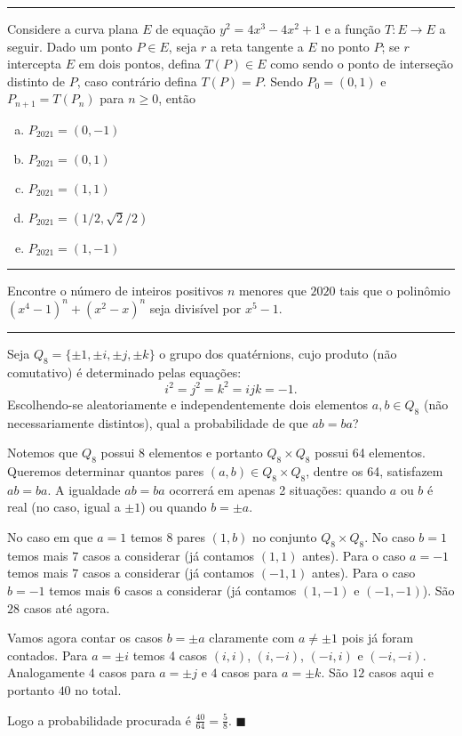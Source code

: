 \documentclass[a4paper,11pt]{report}
\renewcommand{\baselinestretch}{1.3}   %
\newcounter{execount}  \setcounter{execount}{1}
\newcommand{\newexe}{ \vspace{\baselineskip} \hrule  \vspace{.5\baselineskip} \noindent {\bfseries
\arabic{execount}.} \addtocounter{execount}{1} }
\newenvironment{solucao}{ \vspace{.5\baselineskip} \renewcommand{\baselinestretch}{1}
                           \noindent {\bfseries Solução:} }
                        { \vspace{.5\baselineskip} \renewcommand{\baselinestretch}{1.2}
                           \hfill {\small $\blacksquare$} }
\begin{document}
\newexe Considere a curva plana $E$ de equação $y^{2} = 4x^{3} - 4x^{2} + 1$ e a função $T : E \to
    E$ a seguir. Dado um ponto $P \in E$, seja $r$ a reta tangente a $E$ no ponto $P$; se $r$
intercepta $E$ em dois pontos, defina $T(P) \in E$ como sendo o ponto de interseção distinto
de $P$, caso contrário defina $T(P) = P$. Sendo $P_{0} = (0, 1)$ e $P_{n+1} = T(P_{n})$ para
$n \geq 0$, então
\begin{enumerate}[(a)]
    \item $P_{2021} = (0,-1)$
    \item $P_{2021} = (0, 1)$
    \item $P_{2021} = (1, 1)$
    \item $P_{2021} = (1/2, \sqrt{2}/2)$
    \item $P_{2021} = (1,-1)$
\end{enumerate}


\newexe Encontre o número de inteiros positivos $n$ menores que $2020$ tais que o polinômio
$(x^{4} - 1)^{n} + (x^{2} - x)^{n}$ seja divisível por $x^{5} - 1$.



\newexe Seja $Q_{8} = \{ \pm 1, \pm i, \pm j, \pm k \}$ o grupo dos quatérnions, cujo produto (não
comutativo) é determinado pelas equações:
$$ i^{2} = j^{2} = k^{2} = ijk = -1. $$
Escolhendo-se aleatoriamente e independentemente dois elementos $a, b \in Q_{8}$ (não
necessariamente distintos), qual a probabilidade de que $ab = ba$?

\begin{solucao}
    Notemos que $Q_{8}$ possui 8 elementos e portanto $Q_{8} \times Q_{8}$ possui 64 elementos.
    Queremos determinar quantos pares $(a,b) \in Q_{8} \times Q_{8}$, dentre os 64, satisfazem $ab
        = ba$. A igualdade $ab = ba$ ocorrerá em apenas 2 situações: quando $a$ ou $b$ é real (no
    caso, igual a $\pm 1$) ou quando $b = \pm a$.

    No caso em que $a = 1$ temos $8$ pares $(1,b)$ no conjunto $Q_{8} \times Q_{8}$. No caso $b =
        1$ temos mais $7$ casos a considerar (já contamos $(1,1)$ antes). Para o caso $a = -1$ temos
    mais $7$ casos a considerar (já contamos $(-1,1)$ antes). Para o caso $b = -1$ temos mais $6$
    casos a considerar (já contamos $(1,-1)$ e $(-1,-1)$). São $28$ casos até agora.

    Vamos agora contar os casos $b = \pm a$ claramente com $a \neq \pm 1$ pois já foram contados.
    Para $a = \pm i$ temos 4 casos $(i, i)$, $(i, -i)$, $(-i,i)$ e $(-i, -i)$. Analogamente $4$
    casos para $a = \pm j$ e $4$ casos para $a = \pm k$. São $12$ casos aqui e portanto $40$ no
    total.

    Logo a probabilidade procurada é $\frac{40}{64} = \frac{5}{8}$.
\end{solucao}
\end{document}
